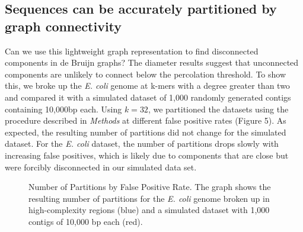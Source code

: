 \documentclass[12pt]{article} \usepackage{simplemargins}
\begin{document}
\subsection{Sequences can be accurately partitioned by graph connectivity}

Can we use this lightweight graph representation to find disconnected
components in de Bruijn graphs?
The diameter results suggest that unconnected
components are unlikely to connect below the percolation threshold. To
show this, we broke up the \emph{E. coli} genome at k-mers with a
degree greater than two and compared it with a simulated dataset of
1,000 randomly generated contigs containing 10,000bp each. Using
$k=32$, we partitioned the datasets using the procedure described in
\emph{Methods} at different false positive rates (Figure 5). As
expected, the resulting number of partitions did not change for the
simulated dataset. For the \emph{E. coli} dataset, the number of
partitions drops slowly with increasing false positives, which is
likely due to components that are close but were forcibly disconnected
in our simulated data set.

\begin{figure}
\caption{Number of Partitions by False Positive Rate. The 
graph shows the resulting number of partitions for the 
\emph{E. coli} genome broken up in high-complexity regions (blue) and 
a simulated dataset with 1,000 contigs of 10,000 bp each (red).}
\end{figure}
\end{document}
